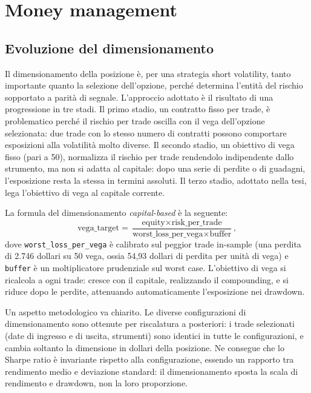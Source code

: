 \chapter{Money management}
\label{ch:money-management}

\section{Evoluzione del dimensionamento}
\label{sec:mm-evoluzione}

Il dimensionamento della posizione è, per una strategia short volatility,
tanto importante quanto la selezione dell'opzione, perché determina
l'entità del rischio sopportato a parità di segnale. L'approccio adottato è
il risultato di una progressione in tre stadi. Il primo stadio, un contratto
fisso per trade, è problematico perché il rischio per trade oscilla con il
vega dell'opzione selezionata: due trade con lo stesso numero di contratti
possono comportare esposizioni alla volatilità molto diverse. Il secondo
stadio, un obiettivo di vega fisso (pari a 50), normalizza il rischio per
trade rendendolo indipendente dallo strumento, ma non si adatta al capitale:
dopo una serie di perdite o di guadagni, l'esposizione resta la stessa in
termini assoluti. Il terzo stadio, adottato nella tesi, lega l'obiettivo di
vega al capitale corrente.

La formula del dimensionamento \emph{capital-based} è la seguente:
%
\begin{equation}
\text{vega\_target} = \frac{\text{equity} \times \text{risk\_per\_trade}}
{\text{worst\_loss\_per\_vega} \times \text{buffer}},
\label{eq:sizing}
\end{equation}
%
dove \texttt{worst\_loss\_per\_vega} è calibrato sul peggior trade
in-sample (una perdita di 2.746 dollari su 50 vega, ossia 54,93 dollari di
perdita per unità di vega) e \texttt{buffer} è un moltiplicatore prudenziale
sul worst case. L'obiettivo di vega si ricalcola a ogni trade: cresce con il
capitale, realizzando il compounding, e si riduce dopo le perdite,
attenuando automaticamente l'esposizione nei drawdown.

Un aspetto metodologico va chiarito. Le diverse configurazioni di
dimensionamento sono ottenute per riscalatura a posteriori: i trade
selezionati (date di ingresso e di uscita, strumenti) sono identici in tutte
le configurazioni, e cambia soltanto la dimensione in dollari della
posizione. Ne consegue che lo Sharpe ratio è invariante rispetto alla
configurazione, essendo un rapporto tra rendimento medio e deviazione
standard: il dimensionamento sposta la scala di rendimento e drawdown, non
la loro proporzione.

